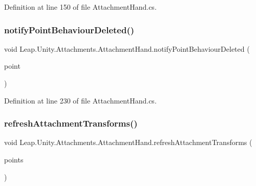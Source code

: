 Definition at line 150 of file Attachment\+Hand.\+cs.

\mbox{\label{class_leap_1_1_unity_1_1_attachments_1_1_attachment_hand_adedcd7d579e0f342314d32a4af28092b}} 
\subsubsection{\texorpdfstring{notifyPointBehaviourDeleted()}{notifyPointBehaviourDeleted()}}
{\footnotesize\ttfamily void Leap.\+Unity.\+Attachments.\+Attachment\+Hand.\+notify\+Point\+Behaviour\+Deleted (\begin{DoxyParamCaption}\item[{\mbox{\hyperlink{class_leap_1_1_unity_1_1_attachments_1_1_attachment_point_behaviour}{Attachment\+Point\+Behaviour}}}]{point }\end{DoxyParamCaption})}



Definition at line 230 of file Attachment\+Hand.\+cs.

\mbox{\label{class_leap_1_1_unity_1_1_attachments_1_1_attachment_hand_ad3c1c16a0e65333e017b6799f0adf234}} 
\subsubsection{\texorpdfstring{refreshAttachmentTransforms()}{refreshAttachmentTransforms()}}
{\footnotesize\ttfamily void Leap.\+Unity.\+Attachments.\+Attachment\+Hand.\+refresh\+Attachment\+Transforms (\begin{DoxyParamCaption}\item[{\mbox{\hyperlink{namespace_leap_1_1_unity_1_1_attachments_a4b32b38f722ad110fcd5a817256e09ab}{Attachment\+Point\+Flags}}}]{points }\end{DoxyParamCaption})}



